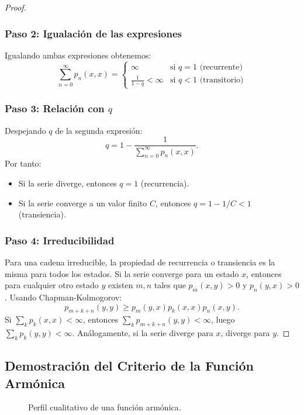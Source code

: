 \documentclass[11pt,a4paper]{article}
\theoremstyle{plain}
\theoremstyle{definition}
\theoremstyle{remark}
\newcommand{\1}{\mathds{1}}
\begin{document}
\begin{proof}
\subsubsection*{Paso 2: Igualación de las expresiones}
Igualando ambas expresiones obtenemos:
\[
\sum_{n=0}^{\infty} p_n(x,x) = 
\begin{cases}
\infty & \text{si } q = 1 \text{ (recurrente)} \\
\frac{1}{1-q} < \infty & \text{si } q < 1 \text{ (transitorio)}
\end{cases}
\]

\subsubsection*{Paso 3: Relación con \(q\)}
Despejando \(q\) de la segunda expresión:
\[
q = 1 - \frac{1}{\sum_{n=0}^{\infty} p_n(x,x)}.
\]
Por tanto:
\begin{itemize}
\item Si la serie diverge, entonces \(q = 1\) (recurrencia).
\item Si la serie converge a un valor finito \(C\), entonces \(q = 1 - 1/C < 1\) (transiencia).
\end{itemize}

\subsubsection*{Paso 4: Irreducibilidad}
Para una cadena irreducible, la propiedad de recurrencia o transiencia es la misma para todos los estados. Si la serie converge para un estado \(x\), entonces para cualquier otro estado \(y\) existen \(m,n\) tales que \(p_m(x,y) > 0\) y \(p_n(y,x) > 0\). Usando Chapman-Kolmogorov:
\[
p_{m+k+n}(y,y) \geq p_m(y,x) p_k(x,x) p_n(x,y).
\]
Si \(\sum_k p_k(x,x) < \infty\), entonces \(\sum_k p_{m+k+n}(y,y) < \infty\), luego \(\sum_k p_k(y,y) < \infty\). Análogamente, si la serie diverge para \(x\), diverge para \(y\).
\end{proof}

\subsection{Demostración del Criterio de la Función Armónica}


\begin{figure}[h!]
\centering
{}
\caption{Perfil cualitativo de una función armónica.}
\end{figure}
\end{document}

